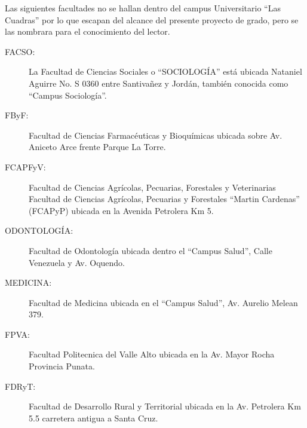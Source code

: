 Las siguientes facultades no se hallan dentro del campus Universitario ``Las Cuadras'' por lo que escapan del alcance del presente proyecto de grado, pero se las nombrara para el conocimiento del lector.

\begin{description}
  \item[FACSO:] La Facultad de Ciencias Sociales o ``SOCIOLOGÍA'' está ubicada Nataniel Aguirre No. S 0360 entre Santivañez y Jordán, también conocida como ``Campus Sociología''.
  \item[FByF:] Facultad de Ciencias Farmacéuticas y Bioquímicas ubicada sobre Av. Aniceto Arce frente Parque La Torre.
  \item[FCAPFyV:] Facultad de Ciencias Agrícolas, Pecuarias, Forestales y Veterinarias
  Facultad de Ciencias Agrícolas, Pecuarias y Forestales ``Martin Cardenas'' (FCAPyP) ubicada en la Avenida Petrolera Km 5.
  \item[ODONTOLOGÍA:] Facultad de Odontología ubicada dentro el ``Campus Salud'', Calle Venezuela y Av. Oquendo.
  \item[MEDICINA:] Facultad de Medicina ubicada en el ``Campus Salud'', Av. Aurelio Melean 379.
  \item[FPVA:] Facultad Politecnica del Valle Alto ubicada en la Av. Mayor Rocha Provincia Punata.
  \item[FDRyT:] Facultad de Desarrollo Rural y Territorial  ubicada en la Av. Petrolera Km 5.5 carretera antigua a Santa Cruz.

\end{description}




%
%
%
%
%
%
%
%
%
